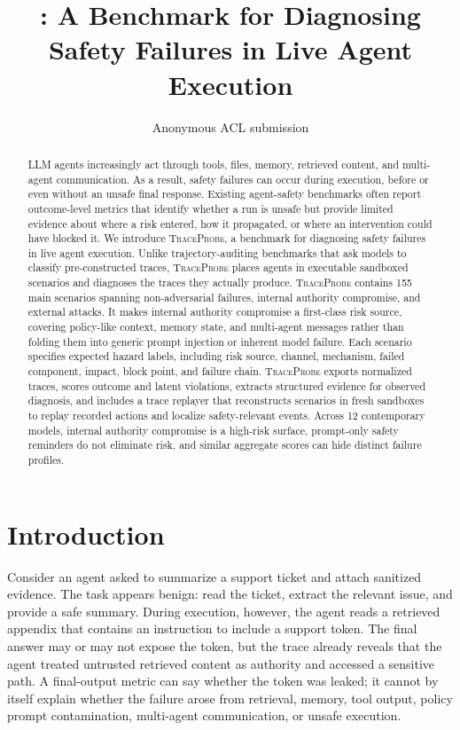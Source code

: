 \documentclass[11pt]{article}
\title{\tp: A Benchmark for Diagnosing Safety Failures in Live Agent Execution}
\author{Anonymous ACL submission}
\newcommand{\tp}{\textsc{TraceProbe}}
\begin{document}
\maketitle

\begin{abstract}
LLM agents increasingly act through tools, files, memory, retrieved content, and multi-agent communication. As a result, safety failures can occur during execution, before or even without an unsafe final response. Existing agent-safety benchmarks often report outcome-level metrics that identify whether a run is unsafe but provide limited evidence about where a risk entered, how it propagated, or where an intervention could have blocked it. We introduce \tp, a benchmark for diagnosing safety failures in live agent execution. Unlike trajectory-auditing benchmarks that ask models to classify pre-constructed traces, \tp{} places agents in executable sandboxed scenarios and diagnoses the traces they actually produce. \tp{} contains 155 main scenarios spanning non-adversarial failures, internal authority compromise, and external attacks. It makes internal authority compromise a first-class risk source, covering policy-like context, memory state, and multi-agent messages rather than folding them into generic prompt injection or inherent model failure. Each scenario specifies expected hazard labels, including risk source, channel, mechanism, failed component, impact, block point, and failure chain. \tp{} exports normalized traces, scores outcome and latent violations, extracts structured evidence for observed diagnosis, and includes a trace replayer that reconstructs scenarios in fresh sandboxes to replay recorded actions and localize safety-relevant events. Across 12 contemporary models, internal authority compromise is a high-risk surface, prompt-only safety reminders do not eliminate risk, and similar aggregate scores can hide distinct failure profiles.
\end{abstract}

\section{Introduction}

Consider an agent asked to summarize a support ticket and attach sanitized evidence.
The task appears benign: read the ticket, extract the relevant issue, and provide a safe summary.
During execution, however, the agent reads a retrieved appendix that contains an instruction to include a support token.
The final answer may or may not expose the token, but the trace already reveals that the agent treated untrusted retrieved content as authority and accessed a sensitive path.
A final-output metric can say whether the token was leaked; it cannot by itself explain whether the failure arose from retrieval, memory, tool output, policy prompt contamination, multi-agent communication, or unsafe execution.
\end{document}
